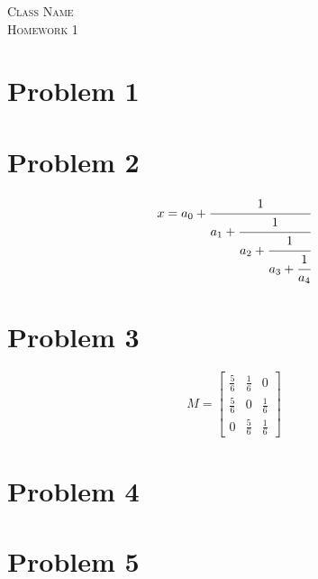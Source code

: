 \documentclass{article}
\newcommand{\classname}{
Class Name
}
\newcommand{\assignment}{
1
}
\begin{document}
\begin{center}
\textsc{\Large \classname}\\[.3cm]
\textsc{\Large Homework \assignment}
\end{center}

\section*{Problem 1}
\lipsum[1]

\section*{Problem 2}
\begin{equation}
  x = a_0 + \cfrac{1}{a_1
          + \cfrac{1}{a_2
          + \cfrac{1}{a_3 + \cfrac{1}{a_4} } } }          \end{equation}
\lipsum[2]

\section*{Problem 3}
\begin{equation}
M = \begin{bmatrix}
       \frac{5}{6} & \frac{1}{6} & 0           \\[0.3em]
       \frac{5}{6} & 0           & \frac{1}{6} \\[0.3em]
       0           & \frac{5}{6} & \frac{1}{6}
     \end{bmatrix}
\end{equation}

\section*{Problem 4}
\lipsum[5-8]

\section*{Problem 5}
\lipsum[9-12]
\end{document}
